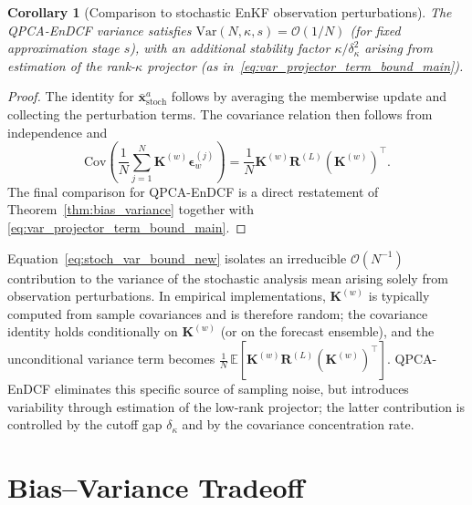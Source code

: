\documentclass[11pt,a4paper]{article}
\newtheorem{corollary}{Corollary}
\begin{document}
\begin{corollary}[Comparison to stochastic EnKF observation perturbations]
The QPCA-EnDCF variance satisfies
$\mathrm{Var}(N,\kappa,s)=\mathcal{O}(1/N)$ (for fixed approximation stage $s$), with an additional stability factor $\kappa/\delta_\kappa^2$ arising from estimation of the rank-$\kappa$ projector (as in~\eqref{eq:var_projector_term_bound_main}).
\end{corollary}

\begin{proof}
The identity for $\bar{\mathbf{x}}^{a}_{\mathrm{stoch}}$ follows by averaging the memberwise update and collecting the perturbation terms. The covariance relation then follows from independence and
\begin{equation}
\mathrm{Cov}\!\left(\frac{1}{N}\sum_{j=1}^N \mathbf{K}^{(w)}\boldsymbol{\epsilon}_{w}^{(j)}\right)
=
\frac{1}{N}\mathbf{K}^{(w)}\mathbf{R}^{(L)}(\mathbf{K}^{(w)})^\top.
\end{equation}
The final comparison for QPCA-EnDCF is a direct restatement of Theorem~\ref{thm:bias_variance} together with \eqref{eq:var_projector_term_bound_main}.
\end{proof}

Equation~\eqref{eq:stoch_var_bound_new} isolates an irreducible $\mathcal{O}(N^{-1})$ contribution to the variance of the stochastic analysis mean arising solely from observation perturbations. In empirical implementations, $\mathbf{K}^{(w)}$ is typically computed from sample covariances and is therefore random; the covariance identity holds conditionally on $\mathbf{K}^{(w)}$ (or on the forecast ensemble), and the unconditional variance term becomes $\frac{1}{N}\,\mathbb{E}\!\left[\mathbf{K}^{(w)}\mathbf{R}^{(L)}(\mathbf{K}^{(w)})^\top\right]$. QPCA-EnDCF eliminates this specific source of sampling noise, but introduces variability through estimation of the low-rank projector; the latter contribution is controlled by the cutoff gap $\delta_\kappa$ and by the covariance concentration rate.
\par\smallskip


\FloatBarrier








\section{Bias--Variance Tradeoff}\label{sec:bias_variance_results}
\end{document}
